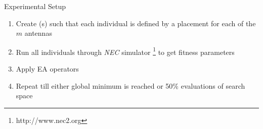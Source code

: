 \documentclass{beamer}
\begin{document}
        
        \begin{frame}[t]{Experimental Setup}
            \begin{enumerate}
                \item Create (s) such that each individual is defined by a placement for each of the $m$ antennas
                \item Run all individuals through \textit{NEC} simulator \footnote{http://www.nec2.org} to get fitness parameters 
                \item Apply EA operators 
                \item Repeat till either global minimum is reached or 50\% evaluations of search space 
            \end{enumerate}
            \vspace{10mm}
        \end{frame}
\end{document}

